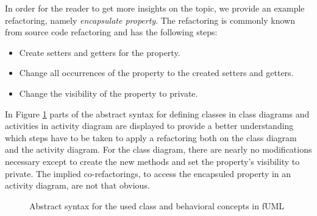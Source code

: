 \documentclass{llncs}
\begin{document}
In order for the reader to get more insights on the topic, we provide an example refactoring, namely \textit{encapsulate property}. 
The refactoring is commonly known from source code refactoring and has the following steps:

\begin{itemize}
 \item Create setters and getters for the property.
 \item Change all occurrences of the property to the created setters and getters.
 \item Change the visibility of the property to private.
\end{itemize}

In Figure \ref{fig:fuml1} parts of the abstract syntax for defining classes in class diagrams and activities in activity diagram are
displayed to provide a better understanding which steps have to be taken to apply a refactoring both on the class diagram and the 
activity diagram. For the class diagram, there are nearly no modifications necessary except to create the new methods and set the
property's visibility to private. The implied co-refactorings, to access the encapsuled property in an activity diagram, are not that 
obvious.

\begin{figure}[h!t]
 \centering
 \caption{Abstract syntax for the used class and behavioral concepts in fUML}
 \label{fig:fuml1}
\end{figure}
\end{document}
